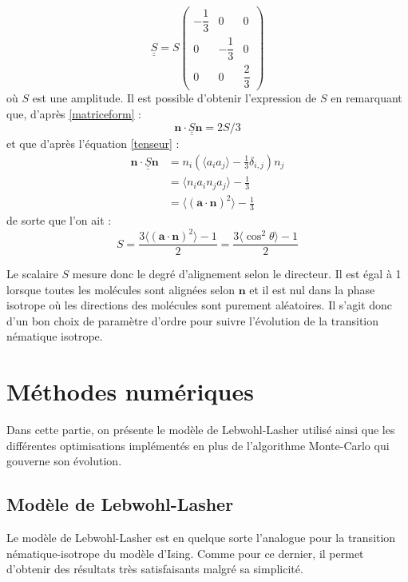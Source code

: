 \documentclass[11pt,a4paper]{article}
\numberwithin{equation}{section}
\begin{document}
\begin{equation}
\underline{\underline{S}} = S
\begin{pmatrix}
 -\dfrac{1}{3} & 0  & 0\\
 0 & -\dfrac{1}{3} &0 \\
 0 &0 & \dfrac{2}{3}
 \end{pmatrix} 
 \label{matriceform}
\end{equation}
où $S$ est une amplitude. Il est possible d'obtenir l'expression de $S$ en remarquant que, d'après \ref{matriceform} :
\begin{equation*}
 \bm{n} \cdot \underline{\underline{S}} \bm{n} = 2S/3
\end{equation*} 
et que d'après l'équation \ref{tenseur} :
\begin{align*}
 \bm{n} \cdot \underline{\underline{S}} \bm{n} & = n_i\left(\langle a_i a_j \rangle-\frac{1}{3} \delta_{i,j} \right )n_j\\ 
 & = \langle n_ia_in_ja_j \rangle -\frac{1}{3}\\
 & = \langle (\bm{a}\cdot \bm{n})^2 \rangle - \frac{1}{3}
\end{align*}
de sorte que l'on ait :
\begin{equation}
S = \frac{3 \langle (\bm{a}\cdot \bm{n})^2\rangle -1}{2} = \frac{3 \langle \cos^2 \theta \rangle -1}{2}
\end{equation}

Le scalaire $S$ mesure donc le degré d'alignement selon le directeur. Il est égal à 1 lorsque toutes les molécules sont alignées selon $\bm{n}$ et il est nul dans la phase isotrope où les directions des molécules sont purement aléatoires. Il s'agit donc d'un bon choix de paramètre d'ordre pour suivre l'évolution de la transition nématique isotrope.
\newpage
\section{Méthodes numériques}
Dans cette partie, on présente le modèle de Lebwohl-Lasher utilisé ainsi que les différentes optimisations implémentés en plus de l'algorithme Monte-Carlo qui gouverne son évolution.

\subsection{Modèle de Lebwohl-Lasher}
\label{lebwohlpart}
Le modèle de Lebwohl-Lasher \cite{model} est en quelque sorte l'analogue pour la transition nématique-isotrope du modèle d'Ising. Comme pour ce dernier, il permet d'obtenir des résultats très satisfaisants malgré sa simplicité.\medskip
\end{document}
